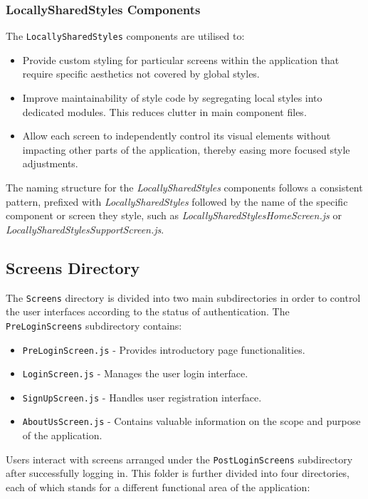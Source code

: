 \subsubsection{LocallySharedStyles Components}

The \texttt{LocallySharedStyles} components are utilised to:
\begin{itemize}
    \item Provide custom styling for particular screens within the application that require specific aesthetics not covered by global styles.
    \item Improve maintainability of style code by segregating local styles into dedicated modules. This reduces clutter in main component files.
    \item Allow each screen to independently control its visual elements without impacting other parts of the application, thereby easing more focused style adjustments.
\end{itemize}

The naming structure for the \textit{LocallySharedStyles} components follows a consistent pattern, prefixed with \textit{LocallySharedStyles} followed by the name of the specific component or screen they style, such as \textit{LocallySharedStylesHomeScreen.js} or \textit{LocallySharedStylesSupportScreen.js}. 

\subsection{Screens Directory}

The \texttt{Screens} directory is divided into two main subdirectories in order to control the user interfaces according to the status of authentication. The \texttt{PreLoginScreens} subdirectory contains:

\begin{itemize}
    \item \texttt{PreLoginScreen.js} - Provides introductory page functionalities.
    \item \texttt{LoginScreen.js} - Manages the user login interface.
    \item \texttt{SignUpScreen.js} - Handles user registration interface.
    \item \texttt{AboutUsScreen.js} - Contains valuable information on the scope and purpose of the application.
\end{itemize}

Users interact with screens arranged under the \texttt{PostLoginScreens} subdirectory after successfully logging in. This folder is further divided into four directories, each of which stands for a different functional area of the application:

